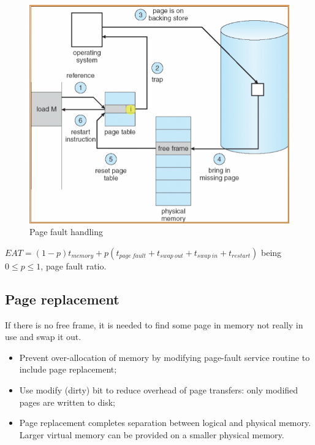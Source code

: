 \begin{figure}[hbtp]
\centering
\includegraphics[scale=0.4]{images/virtual_memory/page_fault.jpg}
\caption{Page fault handling}
\end{figure}

$EAT = (1-p) t_{memory} + p (t_{page\ fault} + t_{swap\ out} + t_{swap\ in} + t_{restart})$ being $ 0 \le p \le 1 $, page fault ratio.

\subsection{Page replacement}
If there is no free frame, it is needed to find some page in memory not really in use and swap it out.
\begin{itemize}
\item Prevent over-allocation of memory by modifying page-fault service routine to include page replacement;
\item Use modify (dirty) bit to reduce overhead of page transfers: only modified pages are written to disk;
\item Page replacement completes separation between logical and physical memory. Larger virtual memory can be provided on a smaller physical memory.
\end{itemize}

